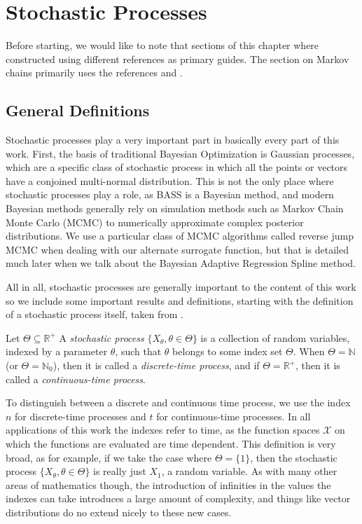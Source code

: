 \chapter{Stochastic Processes}

Before starting, we would like to note that sections of this chapter where constructed using different references as primary guides. The section on Markov chains primarily uses the references \cite{Zitkovic_2010} and \cite{hohendorff_introduction_2005}. 

\section{General Definitions}

Stochastic processes play a very important part in basically every part of this work. First, the basis of traditional Bayesian Optimization is Gaussian processes, which are a specific class of stochastic process in which all the points or vectors have a conjoined multi-normal distribution. This is not the only place where stochastic processes play a role, as BASS is a Bayesian method, and modern Bayesian methods generally rely on simulation methods such as Markov Chain Monte Carlo (MCMC) to numerically approximate complex posterior distributions. We use a particular class of MCMC algorithms called reverse jump MCMC when dealing with our alternate surrogate function, but that is detailed much later when we talk about the Bayesian Adaptive Regression Spline method. 

All in all, stochastic processes are generally important to the content of this work so we include some important results and definitions, starting with the definition of a stochastic process itself, taken from \cite[\S 3.0]{Zitkovic_2010}. 

\begin{definition}
	Let $\Theta \subseteq \mathbb{R}^+$ A \textit{stochastic process} $\{ X_\theta, \theta \in \Theta \}$ is a collection of random variables, indexed by a parameter $\theta$, such that $\theta$ belongs to some index set $\Theta$. When $\Theta = \mathbb{N}$ (or $\Theta = \mathbb{N}_0$), then it is called a \textit{discrete-time process}, and if $\Theta = \mathbb{R}^+$, then it is called a \textit{continuous-time process}. 
\end{definition}

To distinguish between a discrete and continuous time process, we use the index $n$ for discrete-time processes and $t$ for continuous-time processes. 
In all applications of this work the indexes refer to time, as the function spaces $\mathcal{X}$ on which the functions are evaluated are time dependent. 
This definition is very broad, as for example, if we take the case where $\Theta = \{1\}$, then the stochastic process $\{ X_\theta, \theta \in \Theta \}$ is really just $X_1$, a random variable. 
As with many other areas of mathematics though, the introduction of infinities in the values the indexes can take introduces a large amount of complexity, and things like vector distributions do no extend nicely to these new cases. 

